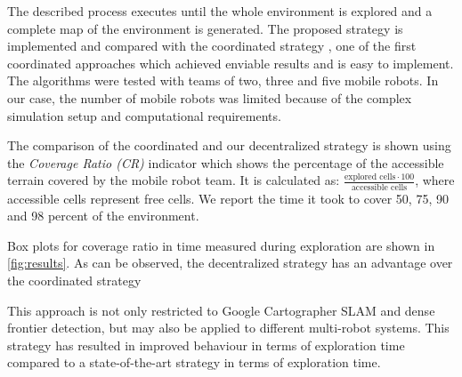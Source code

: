 The described process executes until the whole environment is explored and a complete  map of the environment is generated.
The proposed strategy is implemented and compared with the coordinated strategy \cite{Burgard2005}, one of the first coordinated approaches which achieved enviable results and is easy to implement. The algorithms were tested with teams of two, three and five mobile robots. In our case, the number of mobile robots was limited because of the complex simulation setup and computational requirements.

The comparison of the coordinated and our decentralized strategy is shown using the \textit{Coverage Ratio (CR)} indicator which shows the percentage of the accessible terrain covered by the mobile robot team. It is calculated as:  \( \frac{\text{explored cells} \cdot 100}{\text{accessible cells}} \), where accessible cells represent free cells. We report the time it took to cover 50, 75, 90 and 98 percent of the environment. 

Box plots for coverage ratio in time measured during exploration are  shown  in  \ref{fig:results}.  As  can  be  observed,  the  decentralized strategy has an advantage over the coordinated strategy

This approach is not only restricted to Google Cartographer SLAM and dense frontier detection, but may also be applied to different multi-robot systems. This strategy has resulted in improved behaviour in terms of exploration time compared to a state-of-the-art strategy in terms of exploration time. 


